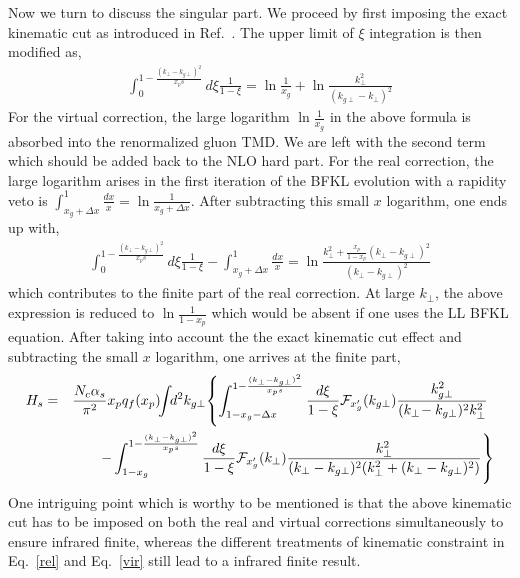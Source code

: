 \documentclass[prd,aps,preprint,tightenlines,nofootinbib,superscriptaddress]{revtex4}
\begin{document}
Now we turn to discuss the singular part. We proceed by first  imposing  the exact kinematic cut  as introduced in Ref.~\cite{Watanabe:2015tja}. The upper limit of $\xi$ integration is then modified as,
  \begin{align}
 \int_0^{1-\frac{(k_\perp-k_{g\perp})^2}{x_ps}}d\xi\frac{1}{1-\xi} =\ln \frac{1}{x_g}+\ln \frac{k_\perp^2}{(k_{g\perp}-k_\perp)^2}
 \label{rel}
 \end{align}
 For the virtual correction, the large logarithm $\ln \frac{1}{x_g}$ in the above formula is absorbed into the renormalized gluon TMD.  We are left with the second term which should be added back to the NLO hard part.  For the real correction,  the large logarithm arises in the first iteration of the BFKL evolution with a rapidity veto is  $\int_{x_g+\Delta x}^1 \frac{dx}{x} =\ln \frac{1}{x_g+\Delta x}$. After subtracting this small $x$ logarithm, one ends up with,
   \begin{align}
 \int_0^{1-\frac{(k_\perp-k_{g\perp})^2}{x_ps}}d\xi\frac{1}{1-\xi} -\int_{x_g+\Delta x}^{1} \frac{dx}{x}=\ln \frac{k_\perp^2+\frac{x_p}{1-x_p}(k_\perp-k_{g\perp})^2}{(k_\perp-k_{g\perp})^2}
 \label{vir}
 \end{align}
 which contributes to the finite part of the real correction.  At large $k_\perp$, the above expression is reduced to $\ln\frac{1}{1-x_p} $ which would be absent if one uses the LL BFKL equation. After taking into account the  the exact kinematic cut effect and subtracting the small $x$ logarithm, one arrives at the finite part, 
\begin{eqnarray}
 H_{s}&=&\frac{N_c\alpha_s}{\pi^2}  x_p q_f(x_p)\!\!\int \!\!d^2 k_{g\perp} \! \left \{ \int_{1-x_g-\Delta x}^{1-\frac{(k_\perp-k_{g\perp})^2}{x_ps}} \frac{d\xi }{1-\xi}{\cal F}_{x_g'}(k_{g\perp}) \frac{k_{g\perp}^2}{(k_\perp\!-k_{g\perp})^2k_\perp^2}   \right .\ \nonumber \\ && \left .\ - \int_{1-x_g}^{1-\frac{(k_\perp-k_{g\perp})^2}{x_ps}} \frac{d\xi }{1-\xi} {\cal F}_{x_g'}(k_{\perp}) \frac{k_{\perp}^2}{(k_\perp-k_{g\perp})^2(k_\perp^2+(k_\perp-k_{g\perp})^2)}   \right \}
\end{eqnarray}
One intriguing point which is worthy to be mentioned is that the above  kinematic cut has to  be imposed on both the real and virtual corrections simultaneously to ensure infrared finite, whereas the different treatments of kinematic constraint in Eq.~\ref{rel} and Eq.~\ref{vir} still lead to a infrared finite result. 

 
\end{document}

